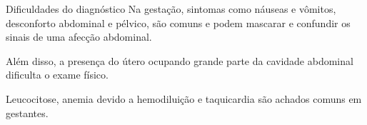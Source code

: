 \begin{frame}{Dificuldades do diagnóstico}
Na gestação, sintomas como náuseas e vômitos, desconforto abdominal e pélvico, são comuns e podem mascarar e confundir os sinais de uma afecção abdominal.\vspace{5mm} 

Além disso, a presença do útero ocupando grande parte da cavidade abdominal dificulta o exame físico.\vspace{5mm}

Leucocitose, anemia devido a hemodiluição e taquicardia são achados comuns em gestantes.
\end{frame}

